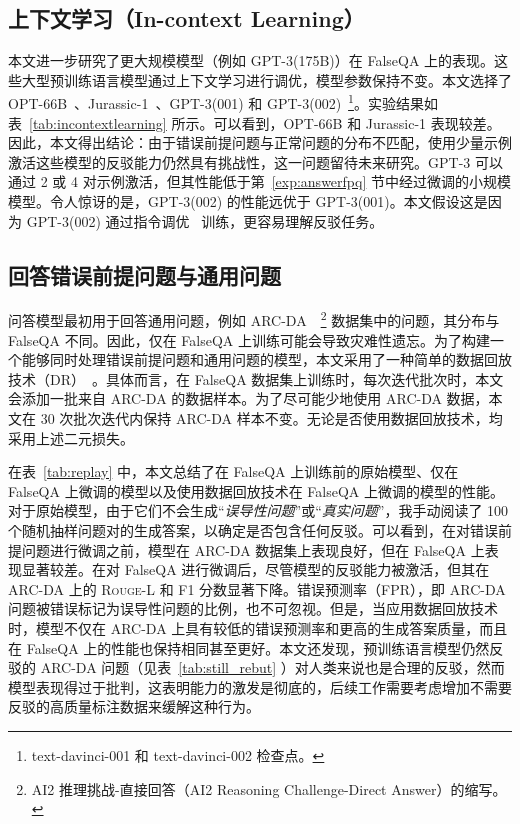 \subsection{上下文学习（In-context Learning）}
本文进一步研究了更大规模模型（例如 GPT-3(175B)）在 FalseQA 上的表现。这些大型预训练语言模型通过上下文学习进行调优，模型参数保持不变。本文选择了 {OPT-66B}~\cite{zhang2022opt}、Jurassic-1~\cite{lieber2021jurassic}、GPT-3(001) 和 GPT-3(002)~\footnote{text-davinci-001 和 text-davinci-002 检查点。}。实验结果如表~\ref{tab:incontextlearning} 所示。可以看到，OPT-66B 和 Jurassic-1 表现较差。因此，本文得出结论：由于错误前提问题与正常问题的分布不匹配，使用少量示例激活这些模型的反驳能力仍然具有挑战性，这一问题留待未来研究。GPT-3 可以通过 2 或 4 对示例激活，但其性能低于第~\ref{exp:answerfpq} 节中经过微调的小规模模型。令人惊讶的是，GPT-3(002) 的性能远优于 GPT-3(001)。本文假设这是因为 GPT-3(002) 通过指令调优~\cite{ouyang2022training} 训练，更容易理解反驳任务。


\subsection{回答错误前提问题与通用问题}
问答模型最初用于回答通用问题，例如 ARC-DA~\cite{bhakthavatsalam2021think}~\footnote{AI2 推理挑战-直接回答（AI2 Reasoning Challenge-Direct Answer）的缩写。} 数据集中的问题，其分布与 FalseQA 不同。因此，仅在 FalseQA 上训练可能会导致灾难性遗忘。为了构建一个能够同时处理错误前提问题和通用问题的模型，本文采用了一种简单的数据回放技术（DR）~\cite{chaudhry2019tiny}。具体而言，在 FalseQA 数据集上训练时，每次迭代批次时，本文会添加一批来自 ARC-DA 的数据样本。为了尽可能少地使用 ARC-DA 数据，本文在 30 次批次迭代内保持 ARC-DA 样本不变。无论是否使用数据回放技术，均采用上述二元损失。

在表~\ref{tab:replay} 中，本文总结了在 FalseQA 上训练前的原始模型、仅在 FalseQA 上微调的模型以及使用数据回放技术在 FalseQA 上微调的模型的性能。对于原始模型，由于它们不会生成“\textit{误导性问题}”或“\textit{真实问题}”，我手动阅读了 100 个随机抽样问题对的生成答案，以确定是否包含任何反驳。可以看到，在对错误前提问题进行微调之前，模型在 ARC-DA 数据集上表现良好，但在 FalseQA 上表现显著较差。在对 FalseQA 进行微调后，尽管模型的反驳能力被激活，但其在 ARC-DA 上的 \textsc{Rouge}-L 和 F1 分数显著下降。错误预测率（FPR），即 ARC-DA 问题被错误标记为误导性问题的比例，也不可忽视。但是，当应用数据回放技术时，模型不仅在 ARC-DA 上具有较低的错误预测率和更高的生成答案质量，而且在 FalseQA 上的性能也保持相同甚至更好。本文还发现，预训练语言模型仍然反驳的 ARC-DA 问题（见表~\ref{tab:still_rebut} ）对人类来说也是合理的反驳，然而模型表现得过于批判，这表明能力的激发是彻底的，后续工作需要考虑增加不需要反驳的高质量标注数据来缓解这种行为。

